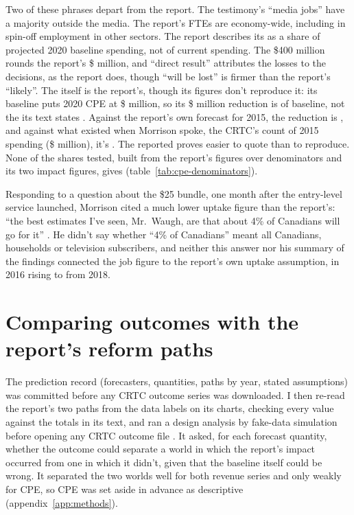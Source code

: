 Two of these phrases depart from the report. The testimony's \enquote{media jobs} have a majority outside the media. The report's \lttvJobsTotal{} FTEs are economy-wide, including \lttvJobsSpinoff{} in spin-off employment in other sectors. The report describes its \lttvCPEShareStated{} as a share of projected 2020 baseline spending, not of current spending. The \$400 million rounds the report's \$\lttvCPEImpactTwenty{} million, and \enquote{direct result} attributes the losses to the decisions, as the report does, though \enquote{will be lost} is firmer than the report's \enquote{likely}. The \lttvCPEShareStated{} itself is the report's, though its figures don't reproduce it: its baseline puts 2020 CPE at \$\lttvCPEBaselineTwenty{} million, so its \$\lttvCPEImpactTwenty{} million reduction is \lttvCPEShareTwenty{} of baseline, not the \lttvCPEShareStated{} its text states \citep[para.~239; Figs.~8, 9, 43]{nordicity2015television}. Against the report's own forecast for 2015, the reduction is \lttvCPEShareFifteen{}, and against what existed when Morrison spoke, the CRTC's count of 2015 spending (\$\lttvCPECRTCFifteen{} million), it's \lttvCPEShareCRTCFifteen{} \citep{crtc2017sfs2016}. The reported \lttvCPEShareStated{} proves easier to quote than to reproduce. None of the \lttvCPENCandidates{} shares tested, built from the report's figures over \lttvCPENDenominators{} denominators and its two impact figures, gives \lttvCPEShareStated{} (table~\ref{tab:cpe-denominators}).

Responding to a question about the \$25 bundle, one month after the entry-level service launched, Morrison cited a much lower uptake figure than the report's: \enquote{the best estimates I've seen, Mr.~Waugh, are that about 4\% of Canadians will go for it} \citep[time marks 0920--0925]{commons2016chpc8}. He didn't say whether \enquote{4\% of Canadians} meant all Canadians, households or television subscribers, and neither this answer nor his summary of the findings connected the job figure to the report's own uptake assumption, \lttvByopSixteen{} in 2016 rising to \lttvByopEighteen{} from 2018.

\section{Comparing outcomes with the report's reform paths}
\label{sec:lttv-method}

The prediction record (forecasters, quantities, paths by year, stated assumptions) was committed before any CRTC outcome series was downloaded. I then re-read the report's two paths from the data labels on its charts, checking every value against the totals in its text, and ran a design analysis by fake-data simulation before opening any CRTC outcome file \citep{gelman2014types, gelman2020bayesianworkflow}. It asked, for each forecast quantity, whether the outcome could separate a world in which the report's impact occurred from one in which it didn't, given that the baseline itself could be wrong. It separated the two worlds well for both revenue series and only weakly for CPE, so CPE was set aside in advance as descriptive (appendix~\ref{app:methods}).

